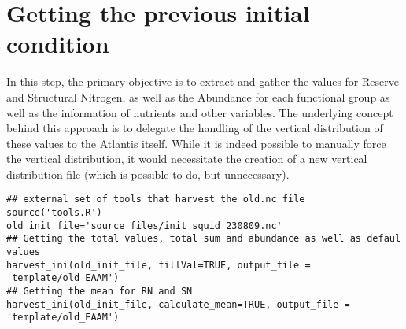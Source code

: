 \documentclass[a4paper]{article}
\begin{document}
\section{Getting the previous initial condition}
\label{sec:orgce41bea}
In this step, the primary objective is to extract and gather the values for Reserve
and Structural Nitrogen, as well as the Abundance for each functional group as well as the information of nutrients and other variables. The
underlying concept behind this approach is to delegate the handling of the vertical
distribution of these values to the Atlantis itself. While it is indeed possible to
manually force the vertical distribution, it would necessitate the creation of a new
vertical distribution file (which is possible to do, but unnecessary).
\begin{verbatim}
## external set of tools that harvest the old.nc file
source('tools.R')
old_init_file='source_files/init_squid_230809.nc'
## Getting the total values, total sum and abundance as well as defaul values
harvest_ini(old_init_file, fillVal=TRUE, output_file = 'template/old_EAAM')
## Getting the mean for RN and SN
harvest_ini(old_init_file, calculate_mean=TRUE, output_file = 'template/old_EAAM')
\end{verbatim}
\end{document}
